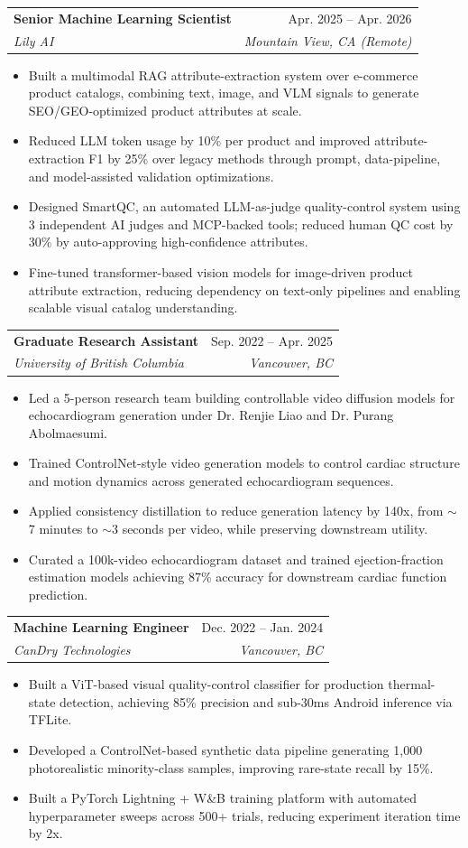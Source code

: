 \documentclass[letterpaper,11pt]{article}
\makeatletter
\newcommand{\resumeItem}[1]{
  \item\small{{#1} \vspace{-2pt}}
}
\newcommand{\resumeSubheading}[4]{
  \vspace{-2pt}\item
    \begin{tabular*}{0.97\textwidth}[t]{l@{\extracolsep{\fill}}r}
      \textbf{#1} & #2 \\
      \textit{\small#3} & \textit{\small #4} \\
    \end{tabular*}\vspace{-7pt}
}
\newcommand{\resumeItemListStart}{\begin{itemize}[leftmargin=0.2in]}
\newcommand{\resumeItemListEnd}{\end{itemize}\vspace{-5pt}}
\makeatother
\begin{document}
    \resumeSubheading
      {Senior Machine Learning Scientist}{Apr. 2025 -- Apr. 2026}
      {Lily AI}{Mountain View, CA (Remote)}
      \resumeItemListStart
        \resumeItem{Built a multimodal RAG attribute-extraction system over e-commerce product catalogs, combining text, image, and VLM signals to generate SEO/GEO-optimized product attributes at scale.}
        \resumeItem{Reduced LLM token usage by 10\% per product and improved attribute-extraction F1 by 25\% over legacy methods through prompt, data-pipeline, and model-assisted validation optimizations.}
        \resumeItem{Designed SmartQC, an automated LLM-as-judge quality-control system using 3 independent AI judges and MCP-backed tools; reduced human QC cost by 30\% by auto-approving high-confidence attributes.}
        \resumeItem{Fine-tuned transformer-based vision models for image-driven product attribute extraction, reducing dependency on text-only pipelines and enabling scalable visual catalog understanding.}
      \resumeItemListEnd

    \resumeSubheading
      {Graduate Research Assistant}{Sep. 2022 -- Apr. 2025}
      {University of British Columbia}{Vancouver, BC}
      \resumeItemListStart
        \resumeItem{Led a 5-person research team building controllable video diffusion models for echocardiogram generation under Dr. Renjie Liao and Dr. Purang Abolmaesumi.}
        \resumeItem{Trained ControlNet-style video generation models to control cardiac structure and motion dynamics across generated echocardiogram sequences.}
        \resumeItem{Applied consistency distillation to reduce generation latency by 140x, from $\sim$7 minutes to $\sim$3 seconds per video, while preserving downstream utility.}
        \resumeItem{Curated a 100k-video echocardiogram dataset and trained ejection-fraction estimation models achieving 87\% accuracy for downstream cardiac function prediction.}
      \resumeItemListEnd

    \resumeSubheading
      {Machine Learning Engineer}{Dec. 2022 -- Jan. 2024}
      {CanDry Technologies}{Vancouver, BC}
      \resumeItemListStart
        \resumeItem{Built a ViT-based visual quality-control classifier for production thermal-state detection, achieving 85\% precision and sub-30ms Android inference via TFLite.}
        \resumeItem{Developed a ControlNet-based synthetic data pipeline generating 1,000 photorealistic minority-class samples, improving rare-state recall by 15\%.}
        \resumeItem{Built a PyTorch Lightning + W\&B training platform with automated hyperparameter sweeps across 500+ trials, reducing experiment iteration time by 2x.}
      \resumeItemListEnd
\end{document}
